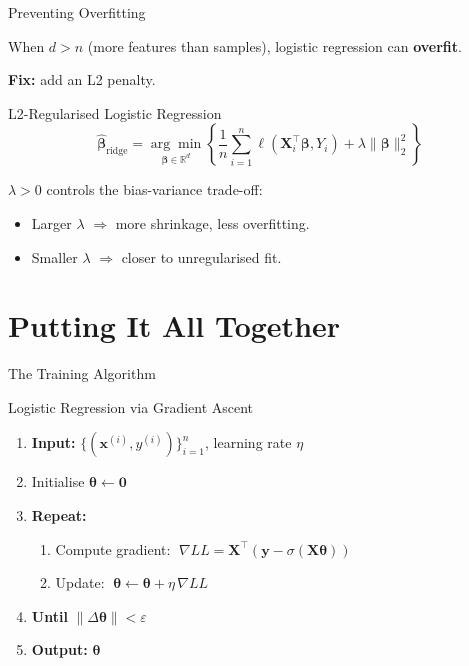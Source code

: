 \documentclass[aspectratio=169, professionalfonts]{beamer}
\def\R{\mathbb{R}}
\begin{document}
\begin{frame}{Preventing Overfitting}

When $d > n$ (more features than samples), logistic regression can
\textbf{overfit}.

\bigskip

\textbf{Fix:} add an L2 penalty.

\begin{block}{L2-Regularised Logistic Regression}
$$\hat{\bm{\beta}}_{\text{ridge}}
  = \underset{\bm{\beta}\in\R^d}{\arg\min}\left\{
    \frac{1}{n}\sum_{i=1}^{n}\ell(\mathbf{X}_i^\top\bm{\beta},Y_i)
    + \lambda\|\bm{\beta}\|_2^2
  \right\}$$
\end{block}

\bigskip

$\lambda > 0$ controls the bias-variance trade-off:
\begin{itemize}
  \item Larger $\lambda$ $\Rightarrow$ more shrinkage, less overfitting.
  \item Smaller $\lambda$ $\Rightarrow$ closer to unregularised fit.
\end{itemize}

\end{frame}

\section{Putting It All Together}

\begin{frame}{The Training Algorithm}

\begin{block}{Logistic Regression via Gradient Ascent}
\begin{enumerate}
  \item \textbf{Input:} $\{(\mathbf{x}^{(i)}, y^{(i)})\}_{i=1}^n$,
        learning rate $\eta$
  \item Initialise $\bm{\theta} \leftarrow \mathbf{0}$
  \item \textbf{Repeat:}
    \begin{enumerate}
      \item[3a.] Compute gradient:
        $\;\nabla LL = \mathbf{X}^\top(\mathbf{y}-\sigma(\mathbf{X}\bm{\theta}))$
      \item[3b.] Update:
        $\;\bm{\theta} \leftarrow \bm{\theta} + \eta\,\nabla LL$
    \end{enumerate}
  \item \textbf{Until} $\|\Delta\bm{\theta}\| < \varepsilon$
  \item \textbf{Output:} $\bm{\theta}$
\end{enumerate}
\end{block}

\end{frame}
\end{document}
